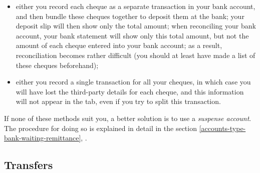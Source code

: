 \begin{itemize}
	\item either you record each cheque as a separate transaction in your bank account, and then bundle these cheques together to deposit them at the bank; your deposit slip will then show only the total amount; when reconciling your bank account, your bank statement will show only this total amount, but not the amount of each cheque entered into your bank account; as a result, reconciliation becomes rather difficult (you should at least have made a list of these cheques beforehand);
	\item either you record a single transaction for all your cheques, in which case you will have lost the third-party details for each cheque, and this information will not appear in the  tab, even if you try to split this transaction.
\end{itemize} 

If none of these methods suit you, a better solution is to use a \emph{suspense account}. The procedure for doing so is explained in detail in the section \vref{accounts-type-bank-waiting-remittance}, .


\subsection{Transfers\label{transactions-new-transfer}}

